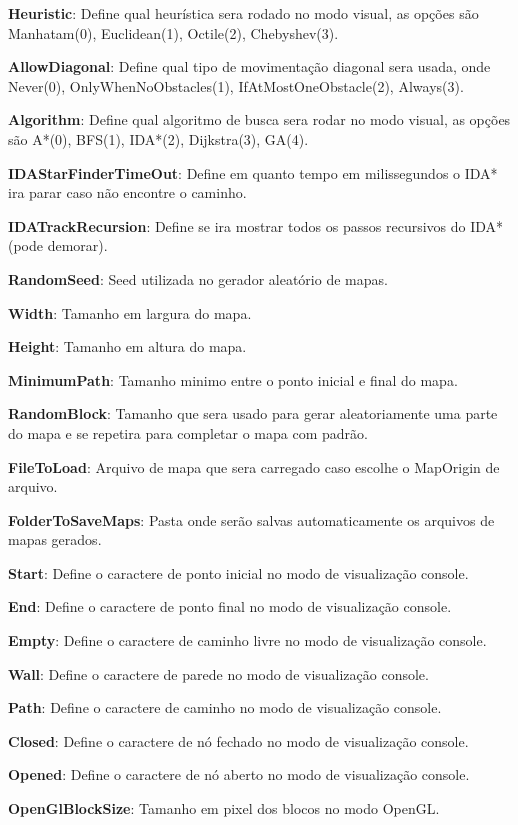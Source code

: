  \textbf{Heuristic}: Define qual heurística sera rodado no modo visual, as opções são Manhatam(0), Euclidean(1), Octile(2), Chebyshev(3).
 
 \textbf{AllowDiagonal}: Define qual tipo de movimentação diagonal sera usada, onde Never(0), OnlyWhenNoObstacles(1), IfAtMostOneObstacle(2), Always(3).
 
 \textbf{Algorithm}: Define qual algoritmo de busca sera rodar no modo visual, as opções são  A\**(0), BFS(1), IDA\**(2), Dijkstra(3), GA(4).
 
 \textbf{IDAStarFinderTimeOut}: Define em quanto tempo em milissegundos o IDA\** ira parar caso não encontre o caminho.
 
 \textbf{IDATrackRecursion}: Define se ira mostrar todos os passos recursivos do IDA\** (pode demorar).
 
 \textbf{RandomSeed}: Seed utilizada no gerador aleatório de mapas.
 
 \textbf{Width}: Tamanho em largura do mapa.
 
 \textbf{Height}: Tamanho em altura do mapa.
 
 \textbf{MinimumPath}: Tamanho minimo entre o ponto inicial e final do mapa.
 
 \textbf{RandomBlock}: Tamanho que sera usado para gerar aleatoriamente uma parte do mapa e se repetira para completar o mapa com padrão.
 
 \textbf{FileToLoad}: Arquivo de mapa que sera carregado caso escolhe o MapOrigin de arquivo.
 
 \textbf{FolderToSaveMaps}: Pasta onde serão salvas automaticamente os arquivos de mapas gerados.
 
 \textbf{Start}: Define o caractere de ponto inicial no modo de visualização console.
 
 \textbf{End}: Define o caractere de ponto final no modo de visualização console.
 
 \textbf{Empty}: Define o caractere de caminho livre no modo de visualização console.
 
 \textbf{Wall}: Define o caractere de parede no modo de visualização console.
 
 \textbf{Path}: Define o caractere de caminho no modo de visualização console.
 
 \textbf{Closed}: Define o caractere de nó fechado no modo de visualização console.
 
 \textbf{Opened}: Define o caractere de nó aberto no modo de visualização console.
 
 \textbf{OpenGlBlockSize}: Tamanho em pixel dos blocos no modo OpenGL.
 
